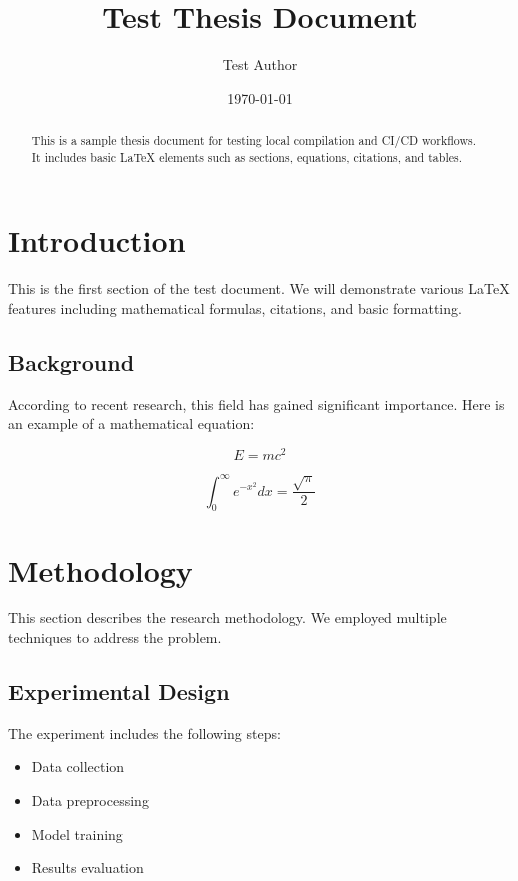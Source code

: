 \documentclass[12pt,a4paper]{article}
\title{Test Thesis Document}
\author{Test Author}
\date{\today}
\begin{document}
\maketitle

\begin{abstract}
This is a sample thesis document for testing local compilation and CI/CD workflows. It includes basic LaTeX elements such as sections, equations, citations, and tables.
\end{abstract}

\section{Introduction}

This is the first section of the test document. We will demonstrate various LaTeX features including mathematical formulas, citations, and basic formatting.

\subsection{Background}

According to recent research\cite{sample2024}, this field has gained significant importance. Here is an example of a mathematical equation:

\begin{equation}
    E = mc^2
\end{equation}

\begin{equation}
    \int_{0}^{\infty} e^{-x^2} dx = \frac{\sqrt{\pi}}{2}
\end{equation}

\section{Methodology}

This section describes the research methodology. We employed multiple techniques\cite{method2023} to address the problem.

\subsection{Experimental Design}

The experiment includes the following steps:
\begin{itemize}
    \item Data collection
    \item Data preprocessing
    \item Model training
    \item Results evaluation
\end{itemize}
\end{document}
